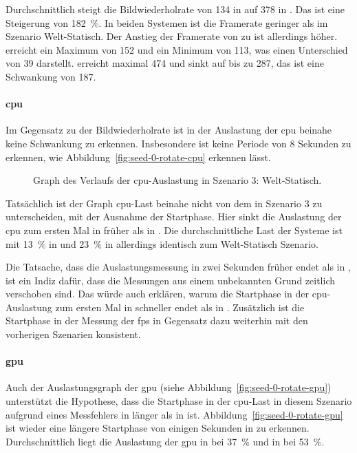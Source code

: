 Durchschnittlich steigt die Bildwiederholrate von \SI{134}{\fps} in \sysA{} auf \SI{378}{\fps} in \sysB{}. Das ist eine Steigerung von \SI{182}{\percent}. In beiden Systemen ist die Framerate geringer als im Szenario Welt-Statisch. Der Anstieg der Framerate von \sysA{} zu \sysB{} ist allerdings höher. \sysA{} erreicht ein Maximum von \SI{152}{\fps} und ein Minimum von \SI{113}{\fps}, was einen Unterschied von \SI{39}{\fps} darstellt. \sysB{} erreicht maximal \SI{474}{\fps} und sinkt auf bis zu \SI{287}{\fps}, das ist eine Schwankung von \SI{187}{\fps}.

\paragraph{\ac{cpu}}
Im Gegensatz zu der Bildwiederholrate ist in der Auslastung der \ac{cpu} beinahe keine Schwankung zu erkennen. Insbesondere ist keine Periode von 8 Sekunden zu erkennen, wie Abbildung~\vref{fig:seed-0-rotate-cpu} erkennen lässt.
\begin{figure}[!htbp]
	\caption[Graph des Verlaufs der -Auslastung in Szenario 4: Welt-Rotation.]{Graph des Verlaufs der \ac{cpu}-Auslastung in Szenario 3: Welt-Statisch.}\label{fig:seed-0-rotate-cpu}
\end{figure}
Tatsächlich ist der Graph \ac{cpu}-Last beinahe nicht von dem in Szenario 3 zu unterscheiden, mit der Ausnahme der Startphase. Hier sinkt die Auslastung der \ac{cpu} zum ersten Mal in \sysB{} früher als in \sysA{}. Die durchschnittliche Last der Systeme  ist mit \SI{13}{\percent} in \sysA{} und \SI{23}{\percent} in \sysB{} allerdings identisch zum Welt-Statisch Szenario.

Die Tatsache, dass die Auslastungsmessung in \sysB{} zwei Sekunden früher endet als in \sysA{}, ist ein Indiz dafür, dass die Messungen aus einem unbekannten Grund zeitlich verschoben sind. Das würde auch erklären, warum die Startphase in der \ac{cpu}-Auslastung zum ersten Mal in \sysB{} schneller endet als in \sysA{}. Zusätzlich ist die Startphase in der Messung der \ac{fps} in Gegensatz dazu weiterhin mit den vorherigen Szenarien konsistent. 

\paragraph{\ac{gpu}}
Auch der Auslastungsgraph der \ac{gpu} (siehe Abbildung~\vref{fig:seed-0-rotate-gpu}) unterstützt die Hypothese, dass die Startphase in der \ac{cpu}-Last in diesem Szenario aufgrund eines Messfehlers in \sysA{} länger als in \sysB{} ist. Abbildung~\vref{fig:seed-0-rotate-gpu} ist wieder eine längere Startphase von einigen Sekunden in \sysB{} zu erkennen. Durchschnittlich liegt die Auslastung der \ac{gpu} in \sysA{} bei \SI{37}{\percent} und in \sysB{} bei \SI{53}{\percent}. 

